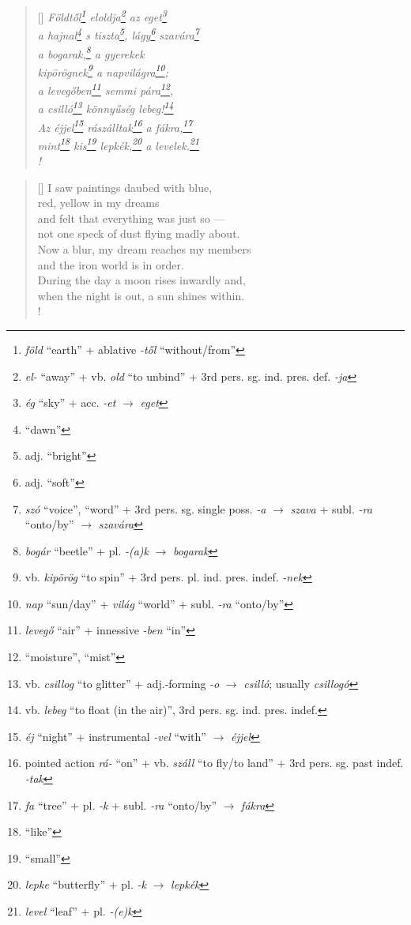 \documentclass[a4paper,12pt,twoside,final]{book}
\begin{document}
\begin{verse}[\versewidth]
  \it
  Földtől\footnote{\emph{föld} ``earth'' +
  ablative \emph{-től} ``without/from''} eloldja\footnote{\emph{el-} ``away''
  + vb. \emph{old} ``to unbind'' + 3rd
  pers. sg. ind. pres. def. \emph{-ja}} az eget\footnote{\emph{ég}
  ``sky'' + acc. \emph{-et} $\rightarrow$ \emph{eget}} \\
  a hajnal\footnote{``dawn''} s tiszta\footnote{adj. ``bright''},
  lágy\footnote{adj. ``soft''} szavára\footnote{\emph{szó} ``voice'',
  ``word'' + 3rd pers. sg. single poss. \emph{-a} $\rightarrow$
  \emph{szava} + subl. \emph{-ra} ``onto/by'' $\rightarrow$
  \emph{szavára}} \\

  a bogarak,\footnote{\emph{bogár} ``beetle'' + pl. \emph{-(a)k}
  $\rightarrow$ \emph{bogarak}} a gyerekek \\
  kipörögnek\footnote{vb. \emph{kipörög} ``to spin'' + 3rd
  pers. pl. ind. pres. indef. \emph{-nek}}
  a napvilágra\footnote{\emph{nap} ``sun/day'' + \emph{világ}
  ``world'' + subl. \emph{-ra} ``onto/by''}; \\
  a levegőben\footnote{\emph{levegő} ``air'' +
  innessive \emph{-ben} ``in''} semmi pára\footnote{``moisture'', ``mist''}, \\
  a csilló\footnote{vb. \emph{csillog} ``to glitter'' +
  adj.-forming \emph{-o} $\rightarrow$
  \emph{csilló}; usually \emph{csillogó}} könnyűség
  lebeg!\footnote{vb. \emph{lebeg} ``to float (in the air)'', 3rd
  pers. sg. ind. pres. indef.} \\
  Az éjjel\footnote{\emph{éj} ``night'' + instrumental \emph{-vel}
  ``with'' $\rightarrow$ \emph{éjjel}} rászálltak\footnote{pointed
  action \emph{rá-} ``on'' + vb. \emph{száll} ``to fly/to
  land'' + 3rd pers. sg. past indef. \emph{-tak}} a
  fákra,\footnote{\emph{fa} ``tree'' +
  pl. \emph{-k} + subl. \emph{-ra} ``onto/by'' $\rightarrow$ \emph{fákra}} \\
  mint\footnote{``like''} kis\footnote{``small''} lepkék,\footnote{\emph{lepke}
  ``butterfly'' + pl. \emph{-k} $\rightarrow$ \emph{lepkék}} a
  levelek.\footnote{\emph{level} ``leaf'' + pl. \emph{-(e)k}} \\!
\end{verse}

\newpage


\settowidth{\versewidth}{Now a blur, my dream reaches my members}

\begin{verse}[\versewidth]
  I saw paintings daubed with blue, \\
  red, yellow in my dreams \\
  and felt that everything was just so ---\\
  not one speck of dust flying madly about. \\
  Now a blur, my dream reaches my members \\
  and the iron world is in order. \\
  During the day a moon rises inwardly and, \\
  when the night is out, a sun shines within. \\!
\end{verse}
\end{document}
